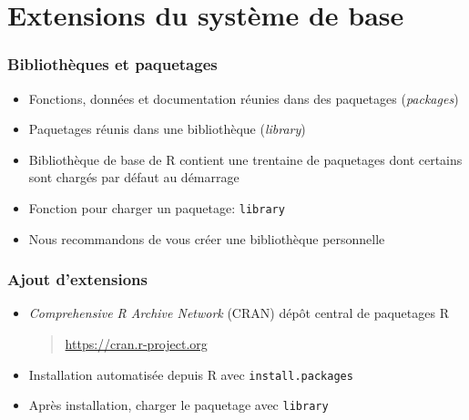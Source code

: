 \section{Extensions du système de base}

\begin{frame}[fragile=singleslide]
  \frametitle{Bibliothèques et paquetages}

  \begin{itemize}
  \item Fonctions, données et documentation réunies dans des
    \alert{paquetages} (\emph{packages})
  \item Paquetages réunis dans une \alert{bibliothèque}
    (\emph{library})
  \item Bibliothèque de base de R contient une trentaine de paquetages
    dont certains sont chargés par défaut au démarrage
  \item Fonction pour charger un paquetage: \texttt{library}
  \item Nous recommandons de vous créer une bibliothèque personnelle
  \end{itemize}
\end{frame}

\begin{frame}[fragile=singleslide]
  \frametitle{Ajout d'extensions}

  \begin{itemize}
  \item \emph{Comprehensive R Archive Network} (CRAN) dépôt central de
    paquetages R
    \begin{quote}
      \url{https://cran.r-project.org}
    \end{quote}
  \item Installation automatisée depuis R avec
    \texttt{install.packages}
  \item Après installation, charger le paquetage avec \texttt{library}
  \end{itemize}

  \pause
\end{frame}

